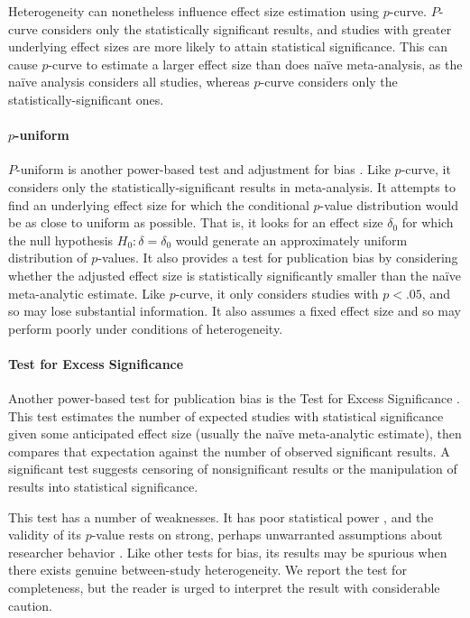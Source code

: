 \documentclass[jou]{apa6}
\begin{document}
Heterogeneity can nonetheless influence effect size estimation using $p$-curve. $P$-curve considers only the statistically significant results, and studies with greater underlying effect sizes are more likely to attain statistical significance. This can cause $p$-curve to estimate a larger effect size than does na{\"i}ve meta-analysis, as the na{\"i}ve analysis considers all studies, whereas $p$-curve considers only the statistically-significant ones. 

\paragraph{$p$-uniform}
$P$-uniform is another power-based test and adjustment for bias \citep{vanAssen:etal:2015}. Like $p$-curve, it considers only the statistically-significant results in meta-analysis. It attempts to find an underlying effect size for which the conditional $p$-value distribution would be as close to uniform as possible. That is, it looks for an effect size $\delta_0$ for which the null hypothesis $H_0: \delta = \delta_0$ would generate an approximately uniform distribution of $p$-values. It also provides a test for publication bias by considering whether the adjusted effect size is statistically significantly smaller than the na{\"i}ve meta-analytic estimate. Like $p$-curve, it only considers studies with $p < .05$, and so may lose substantial information. It also assumes a fixed effect size and so may perform poorly under conditions of heterogeneity.   

\paragraph{Test for Excess Significance}
Another power-based test for publication bias is the Test for Excess Significance \citep{Ioannidis:Trikalinos:2007}. This test estimates the number of expected studies with statistical significance given some anticipated effect size (usually the na{\"i}ve meta-analytic estimate), then compares that expectation against the number of observed significant results. A significant test suggests censoring of nonsignificant results or the manipulation of results into statistical significance.

This test has a number of weaknesses. It has poor statistical power \citep{Ioannidis:Trikalinos:2007}, and the validity of its $p$-value rests on strong, perhaps unwarranted assumptions about researcher behavior \citep{Morey:2013}. Like other tests for bias, its results may be spurious when there exists genuine between-study heterogeneity. We report the test for completeness, but the reader is urged to interpret the result with considerable caution.
\end{document}
